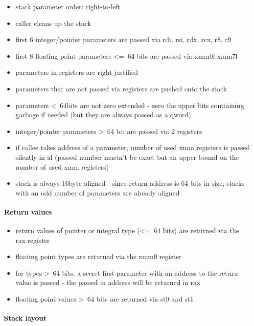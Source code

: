 \begin{itemize}
\item stack parameter order: right-to-left
\item caller cleans up the stack
\item first 6 integer/pointer parameters are passed via rdi, rsi, rdx, rcx, r8, r9
\item first 8 floating point parameters \textless=\ 64 bits are passed via xmm0l-xmm7l
\item parameters in registers are right justified
\item parameters that are not passed via registers are pushed onto the stack
\item parameters \textless\ 64bits are not zero extended - zero the upper bits contiaining garbage if needed (but they are always
passed as a qword)
\item integer/pointer parameters \textgreater\ 64 bit are passed via 2 registers
\item if callee takes address of a parameter, number of used xmm registers is passed silently in al (passed number mustn't be
exact but an upper bound on the number of used xmm registers)
\item stack is always 16byte aligned - since return address is 64 bits in size, stacks with an odd number of parameters are
already aligned
\end{itemize}


\paragraph{Return values}

\begin{itemize}
\item return values of pointer or integral type (\textless=\ 64 bits) are returned via the rax register
\item floating point types are returned via the xmm0 register
\item for types \textgreater\ 64 bits, a secret first parameter with an address to the return value is passed - the passed in address
will be returned in rax
\item floating point values \textgreater\ 64 bits are returned via st0 and st1
\end{itemize}


\paragraph{Stack layout}

